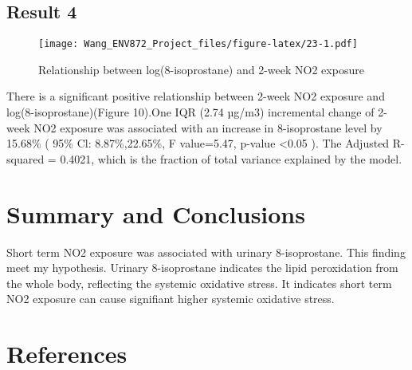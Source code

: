 \documentclass[12pt,]{article}
\begin{document}
\hypertarget{result-4}{%
\subsection{Result 4}\label{result-4}}

\begin{figure}
\centering
\texttt{[image: Wang\_ENV872\_Project\_files/figure-latex/23-1.pdf]}
\caption{Relationship between log(8-isoprostane) and 2-week NO2
exposure}
\end{figure}

There is a significant positive relationship between 2-week NO2 exposure
and log(8-isoprostane)(Figure 10).One IQR (2.74 µg/m3) incremental
change of 2-week NO2 exposure was associated with an increase in
8-isoprostane level by 15.68\% ( 95\% Cl: 8.87\%,22.65\%, F value=5.47,
p-value \textless0.05 ). The Adjusted R-squared = 0.4021, which is the
fraction of total variance explained by the model.

\hypertarget{summary-and-conclusions}{%
\section{Summary and Conclusions}\label{summary-and-conclusions}}

Short term NO2 exposure was associated with urinary 8-isoprostane. This
finding meet my hypothesis. Urinary 8-isoprostane indicates the lipid
peroxidation from the whole body, reflecting the systemic oxidative
stress. It indicates short term NO2 exposure can cause signifiant higher
systemic oxidative stress.

\newpage

\hypertarget{references}{%
\section{References}\label{references}}
\end{document}
